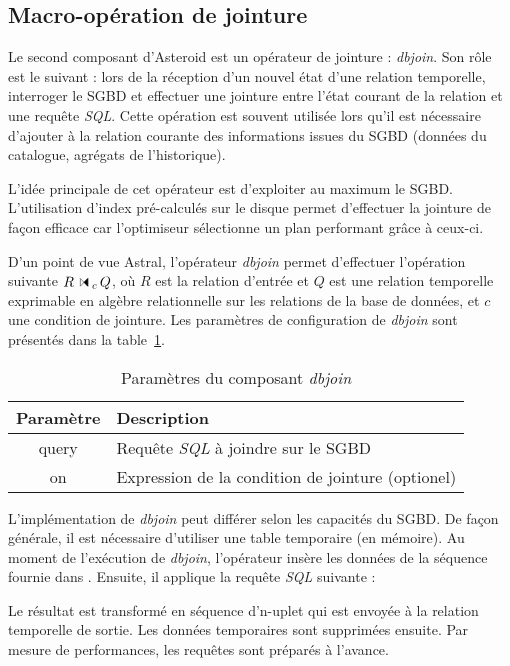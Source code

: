 \subsection{Macro-opération de jointure}
Le second composant d'Asteroid est un opérateur de jointure : \textit{dbjoin}. Son rôle est le suivant : lors de la réception d'un nouvel état d'une relation temporelle, interroger le SGBD et effectuer une jointure entre l'état courant de la relation et une requête \textit{SQL}. Cette opération est souvent utilisée lors qu'il est nécessaire d'ajouter à la relation courante des informations issues du SGBD (données du catalogue, agrégats de l'historique).

L'idée principale de cet opérateur est d'exploiter au maximum le SGBD. L'utilisation d'index pré-calculés sur le disque permet d'effectuer la jointure de façon efficace car l'optimiseur sélectionne un plan performant grâce à ceux-ci.

D'un point de vue Astral, l'opérateur \textit{dbjoin} permet d'effectuer l'opération suivante $R \ssjoin_c Q$, où $R$ est la relation d'entrée et $Q$ est une relation temporelle exprimable en algèbre relationnelle sur les relations de la base de données, et $c$ une condition de jointure. Les paramètres de configuration de \textit{dbjoin} sont présentés dans la table~\ref{tab:contrib:asteroid:dbjoin}.
\begin{table}[ht]
    \centering
    \begin{tabular}{cl}
        Paramètre & Description \\ \midrule
        query & Requête \textit{SQL} à joindre sur le SGBD \\
        on & Expression de la condition de jointure (optionel)
    \end{tabular}
    \caption{Paramètres du composant \textit{dbjoin}}\label{tab:contrib:asteroid:dbjoin}
\end{table}

L'implémentation de \textit{dbjoin} peut différer selon les capacités du SGBD. De façon générale, il est nécessaire d'utiliser une table temporaire  (en mémoire). Au moment de l'exécution de \textit{dbjoin}, l'opérateur insère les données de la séquence fournie dans . Ensuite, il applique la requête \textit{SQL} suivante : \begin{center}  \end{center}
Le résultat est transformé en séquence d'n-uplet qui est envoyée à la relation temporelle de sortie. Les données temporaires sont supprimées ensuite. Par mesure de performances, les requêtes sont préparés à l'avance.

